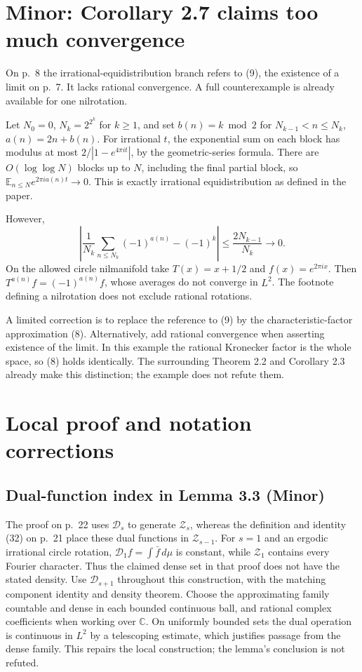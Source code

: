 \documentclass[10pt]{article}
\begin{document}
\section*{Minor: Corollary 2.7 claims too much convergence}
On p. 8 the irrational-equidistribution branch refers to (9), the existence of a limit on p. 7. It lacks rational convergence. A full counterexample is already available for one nilrotation.\par
Let \(N_0=0\), \(N_k=2^{2^k}\) for \(k\ge1\), and set \(b(n)=k\bmod2\) for \(N_{k-1}<n\le N_k\), \(a(n)=2n+b(n)\). For irrational \(t\), the exponential sum on each block has modulus at most \(2/|1-e^{4\pi it}|\), by the geometric-series formula. There are \(O(\log\log N)\) blocks up to \(N\), including the final partial block, so \(\mathbb E_{n\le N}e^{2\pi i a(n)t}\to0\). This is exactly irrational equidistribution as defined in the paper.\par
However, \[\left|\frac1{N_k}\sum_{n\le N_k}(-1)^{a(n)}-(-1)^k\right|
 \le \frac{2N_{k-1}}{N_k}\longrightarrow0.\] On the allowed circle nilmanifold take \(T(x)=x+1/2\) and \(f(x)=e^{2\pi ix}\). Then \(T^{a(n)}f=(-1)^{a(n)}f\), whose averages do not converge in \(L^2\). The footnote defining a nilrotation does not exclude rational rotations.\par
A limited correction is to replace the reference to (9) by the characteristic-factor approximation (8). Alternatively, add rational convergence when asserting existence of the limit. In this example the rational Kronecker factor is the whole space, so (8) holds identically. The surrounding Theorem 2.2 and Corollary 2.3 already make this distinction; the example does not refute them.\par
\section*{Local proof and notation corrections}
\subsection*{Dual-function index in Lemma 3.3 (Minor)}
The proof on p. 22 uses \(\mathcal D_s\) to generate \(\mathcal Z_s\), whereas the definition and identity (32) on p. 21 place these dual functions in \(\mathcal Z_{s-1}\). For \(s=1\) and an ergodic irrational circle rotation, \(\mathcal D_1f=\int\bar f\,d\mu\) is constant, while \(\mathcal Z_1\) contains every Fourier character. Thus the claimed dense set in that proof does not have the stated density. Use \(\mathcal D_{s+1}\) throughout this construction, with the matching component identity and density theorem. Choose the approximating family countable and dense in each bounded continuous ball, and rational complex coefficients when working over \(\mathbb C\). On uniformly bounded sets the dual operation is continuous in \(L^2\) by a telescoping estimate, which justifies passage from the dense family. This repairs the local construction; the lemma’s conclusion is not refuted.\par
\end{document}
